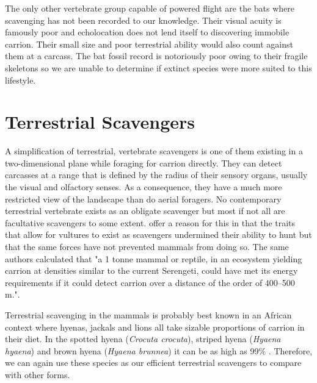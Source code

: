 \documentclass[a4paper,12pt]{article}
\begin{document}
The only other vertebrate group capable of powered flight are the bats where scavenging has not been recorded to our knowledge. Their visual acuity is famously poor and echolocation does not lend itself to discovering immobile carrion. Their small size and poor terrestrial ability would also count against them at a carcass. The bat fossil record is notoriously poor owing to their fragile skeletons so we are unable to determine if extinct species were more suited to this lifestyle.

\section*{Terrestrial Scavengers}
A simplification of terrestrial, vertebrate scavengers is one of them existing in a two-dimensional plane while foraging for carrion directly. They can detect carcasses at a range that is defined by the radius of their sensory organs, usually the visual and olfactory senses. As a consequence, they have a much more restricted view of the landscape than do aerial foragers. No contemporary terrestrial vertebrate exists as an obligate scavenger but most if not all are facultative scavengers to some extent. \cite{ruxton2004obligate} offer a reason for this in that the traits that allow for vultures to exist as scavengers undermined their ability to hunt but that the same forces have not prevented mammals from doing so. The same authors calculated that "a 1 tonne mammal or reptile, in an ecosystem yielding carrion at densities similar to the current Serengeti, could have met its energy requirements if it could detect carrion over a distance of the order of 400–500 m."\citep{ruxton2004obligate}. 

Terrestrial scavenging in the mammals is probably best known in an African context where hyenas, jackals and lions all take sizable proportions of carrion in their diet. In the spotted hyena (\textit{Crocuta crocuta}), striped hyena (\textit{Hyaena hyaena}) and brown hyena (\textit{Hyaena brunnea}) it can be as high as 99\% \citep{benbow2015introduction}. Therefore, we can again use these species as our efficient terrestrial scavengers to compare with other forms. 
\end{document}
